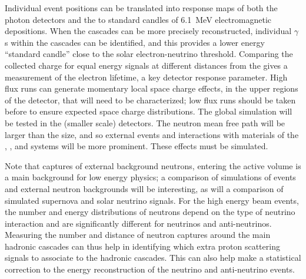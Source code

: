 Individual event positions can be translated into response maps of both the photon detectors and the  to standard candles of \SI{6.1}{\MeV} electromagnetic depositions. When the cascades can be more precisely reconstructed, individual $\gamma$s within the cascades can be identified, and this provides a lower energy ``standard candle'' close to the solar electron-neutrino threshold. Comparing the collected charge for equal energy signals at different distances from the  gives a measurement of the electron lifetime, a key detector response parameter. High  flux runs can generate momentary local space charge effects, in the 
upper regions of the detector, that will need to be characterized; low flux runs should be taken before to ensure %
expected space charge distributions.
The global simulation will be tested in the (smaller scale)  detectors. The neutron mean free path will be larger than the  size, and so 
external events and interactions with materials of the , , and  systems will be more prominent. These effects must be simulated.

Note that captures of external background neutrons, entering the active volume is a main background for low energy physics; a comparison of simulations of  events and external neutron backgrounds will be interesting, as will a comparison of simulated supernova and solar neutrino signals. For the high energy beam events, the number and energy distributions of neutrons depend on the type of neutrino interaction and are significantly different for neutrinos and anti-neutrinos. Measuring the number and distance of neutron captures around the main hadronic cascades can thus help in identifying which extra proton scattering signals to associate to the hadronic cascades. This can also help make a statistical correction to the energy reconstruction of the neutrino and anti-neutrino events.




